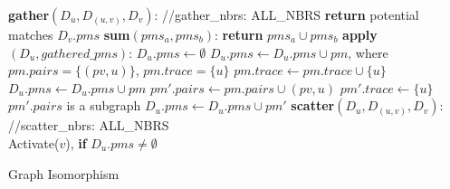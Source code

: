 \documentclass{article}
\begin{document}
	
	
	\begin{algorithm}
	\begin{algorithmic}[1]
	\STATE \textbf{gather}$(D_u, D_{(u,v)}, D_v)$: //gather\_nbrs: ALL\_NBRS
	\STATE \textbf{return} potential matches $D_v.pms$
	\newline
	\STATE \textbf{sum}$(pms_a, pms_b)$: \textbf{return} $pms_a \cup pms_b$
	\newline
	\STATE \textbf{apply}$(D_u, gathered\_pms)$:
	\STATE $D_u.pms \leftarrow \emptyset$
				\STATE $D_u.pms \leftarrow D_u.pms \cup pm$, where $pm.pairs = \{(pv, u)\}$, $pm.trace = \{u\}$   
			\ENDIF
		\ENDFOR
	\ELSE		
				\STATE $pm.trace \leftarrow pm.trace \cup \{u\}$ 
				\STATE $D_u.pms \leftarrow D_u.pms \cup pm$
						\STATE $pm'.pairs \leftarrow pm.pairs \cup (pv,u)$
						\STATE $pm'.trace \leftarrow \{u\}$	
							\STATE $pm'.pairs$ is a subgraph
						\ELSE
							\STATE $D_u.pms \leftarrow D_u.pms \cup pm'$
						\ENDIF		
					\ENDIF
				\ENDFOR		
			\ENDIF
		\ENDFOR		
	\ENDIF	
	\newline
	\STATE \textbf{scatter}$(D_u, D_{(u,v)}, D_v)$: //scatter\_nbrs: ALL\_NBRS\\
	\STATE 	Activate($v$), \textbf{if} $D_u.pms \neq \emptyset$

	\end{algorithmic}
	\caption{Graph Isomorphism}	
	\end{algorithm}
	
\end{document}
